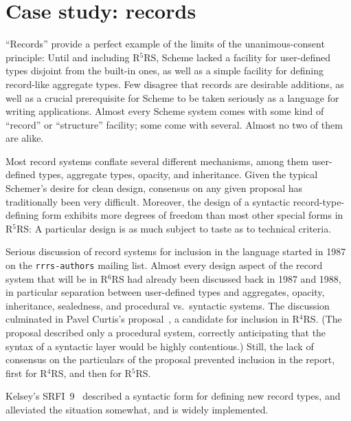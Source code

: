 \documentclass{sigplanconf}
\newcommand{\rn}[1]{R$^{#1}$RS}
\begin{document}
\section{Case study: records}
\label{sec:records}

``Records'' provide a perfect example of the limits of the
unanimous-consent principle: Until and including \rn{5}, Scheme lacked
a facility for user-defined types disjoint from the built-in ones, as
well as a simple facility for defining record-like aggregate types.  Few
disagree that records are desirable additions, as
well as a crucial prerequisite for Scheme to be taken seriously as a
language for writing applications.  Almost every Scheme system comes
with some kind of ``record'' or ``structure'' facility; some come with
several.  Almost no two of them are alike.

Most record systems conflate several different mechanisms, among them
user-defined types, aggregate types, opacity, and inheritance.  Given
the typical Schemer's desire for clean design, consensus on any given
proposal has traditionally been very difficult.  Moreover, the design of
a syntactic record-type-defining form exhibits more degrees of freedom
than most other special forms in \rn{5}: A particular design is as
much subject to taste as to technical criteria.

Serious discussion of record systems for inclusion in the language
started in 1987 on the \texttt{rrrs-authors} mailing list.  Almost
every design aspect of the record system that will be in \rn{6} had already
been discussed back in 1987 and 1988, in particular separation between
user-defined types and aggregates, opacity, inheritance, sealedness,
and procedural vs.\ syntactic systems.  The discussion culminated in
Pavel Curtis's proposal~\cite{Curtis1991}, a candidate for inclusion
in \rn{4}.  (The proposal described only a procedural system,
correctly anticipating that the syntax of a syntactic layer would be
highly contentious.)  Still, the lack of consensus on the particulars
of the proposal prevented inclusion in the report, first for \rn{4},
and then for \rn{5}.

Kelsey's SRFI~9~\cite{srfi9} described a syntactic form for
defining new record types, and alleviated the situation somewhat, and
is widely implemented.
\end{document}
